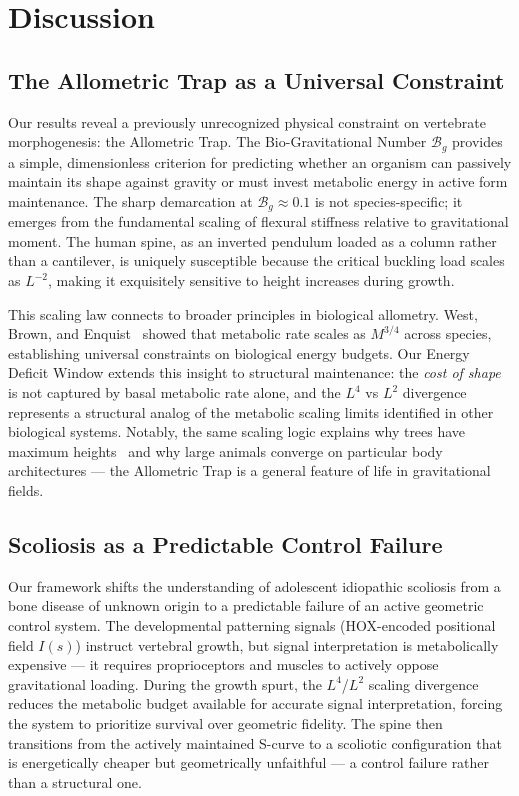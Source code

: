 \section{Discussion}

\subsection{The Allometric Trap as a Universal Constraint}

Our results reveal a previously unrecognized physical constraint on vertebrate morphogenesis: the Allometric Trap. The Bio-Gravitational Number $\mathcal{B}_g$ provides a simple, dimensionless criterion for predicting whether an organism can passively maintain its shape against gravity or must invest metabolic energy in active form maintenance. The sharp demarcation at $\mathcal{B}_g \approx 0.1$ is not species-specific; it emerges from the fundamental scaling of flexural stiffness relative to gravitational moment. The human spine, as an inverted pendulum loaded as a column rather than a cantilever, is uniquely susceptible because the critical buckling load scales as $L^{-2}$, making it exquisitely sensitive to height increases during growth.

This scaling law connects to broader principles in biological allometry. West, Brown, and Enquist~\cite{west1997general} showed that metabolic rate scales as $M^{3/4}$ across species, establishing universal constraints on biological energy budgets. Our Energy Deficit Window extends this insight to structural maintenance: the \emph{cost of shape} is not captured by basal metabolic rate alone, and the $L^4$ vs $L^2$ divergence represents a structural analog of the metabolic scaling limits identified in other biological systems. Notably, the same scaling logic explains why trees have maximum heights~\cite{niklas1994plant} and why large animals converge on particular body architectures --- the Allometric Trap is a general feature of life in gravitational fields.

\subsection{Scoliosis as a Predictable Control Failure}

Our framework shifts the understanding of adolescent idiopathic scoliosis from a bone disease of unknown origin to a predictable failure of an active geometric control system. The developmental patterning signals (HOX-encoded positional field $I(s)$) instruct vertebral growth, but signal interpretation is metabolically expensive --- it requires proprioceptors and muscles to actively oppose gravitational loading. During the growth spurt, the $L^4$/$L^2$ scaling divergence reduces the metabolic budget available for accurate signal interpretation, forcing the system to prioritize survival over geometric fidelity. The spine then transitions from the actively maintained S-curve to a scoliotic configuration that is energetically cheaper but geometrically unfaithful --- a control failure rather than a structural one.

